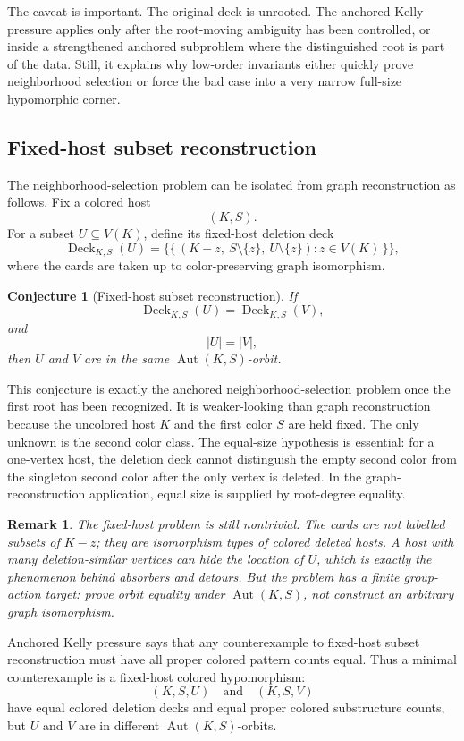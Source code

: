 \documentclass[11pt]{article}
\newtheorem{conjecture}{Conjecture}
\newtheorem{remark}{Remark}
\newcommand{\Deck}{\operatorname{Deck}}
\newcommand{\Aut}{\operatorname{Aut}}
\begin{document}
The caveat is important.  The original deck is unrooted.  The anchored Kelly
pressure applies only after the root-moving ambiguity has been controlled, or
inside a strengthened anchored subproblem where the distinguished root is
part of the data.  Still, it explains why low-order invariants either quickly
prove neighborhood selection or force the bad case into a very narrow
full-size hypomorphic corner.

\subsection{Fixed-host subset reconstruction}

The neighborhood-selection problem can be isolated from graph reconstruction
as follows.  Fix a colored host
\[
  (K,S).
\]
For a subset \(U\subseteq V(K)\), define its fixed-host deletion deck
\[
  \Deck_{K,S}(U)
  =
  \{\!\{\, (K-z,\ S\setminus\{z\},\ U\setminus\{z\}) : z\in V(K) \,\}\!\},
\]
where the cards are taken up to color-preserving graph isomorphism.

\begin{conjecture}[Fixed-host subset reconstruction]
If
\[
  \Deck_{K,S}(U)=\Deck_{K,S}(V),
\]
and
\[
  |U|=|V|,
\]
then \(U\) and \(V\) are in the same \(\Aut(K,S)\)-orbit.
\end{conjecture}

This conjecture is exactly the anchored neighborhood-selection problem once
the first root has been recognized.  It is weaker-looking than graph
reconstruction because the uncolored host \(K\) and the first color \(S\) are
held fixed.  The only unknown is the second color class.  The equal-size
hypothesis is essential: for a one-vertex host, the deletion deck cannot
distinguish the empty second color from the singleton second color after the
only vertex is deleted.  In the graph-reconstruction application, equal size
is supplied by root-degree equality.

\begin{remark}
The fixed-host problem is still nontrivial.  The cards are not labelled
subsets of \(K-z\); they are isomorphism types of colored deleted hosts.  A
host with many deletion-similar vertices can hide the location of \(U\), which
is exactly the phenomenon behind absorbers and detours.  But the problem has
a finite group-action target: prove orbit equality under \(\Aut(K,S)\), not
construct an arbitrary graph isomorphism.
\end{remark}

Anchored Kelly pressure says that any counterexample to fixed-host subset
reconstruction must have all proper colored pattern counts equal.  Thus a
minimal counterexample is a fixed-host colored hypomorphism:
\[
  (K,S,U)
  \quad\text{and}\quad
  (K,S,V)
\]
have equal colored deletion decks and equal proper colored substructure
counts, but \(U\) and \(V\) are in different \(\Aut(K,S)\)-orbits.
\end{document}
